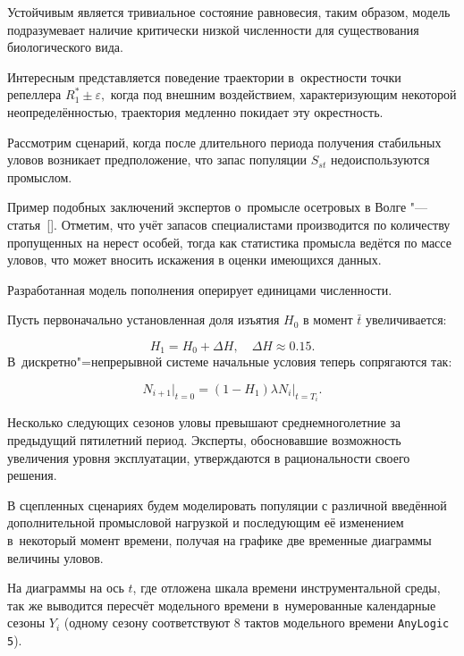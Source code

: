 Устойчивым является тривиальное состояние равновесия, таким образом, модель подразумевает наличие критически низкой численности для существования биологического вида. 

Интересным представляется поведение траектории в~окрестности точки репеллера $R^*_1 \pm \varepsilon ,$ когда под  внешним воздействием, характеризующим некоторой неопределённостью, траектория медленно покидает эту окрестность.







Рассмотрим сценарий, когда после длительного периода получения стабильных уловов возникает предположение, что запас популяции $S_{st}$ недоиспользуются промыслом. 

Пример подобных заключений экспертов о~промысле осетровых в Волге "--- статья~[]. Отметим, что учёт запасов специалистами  производится по количеству пропущенных на нерест особей, тогда как статистика промысла ведётся по массе уловов, что может вносить искажения в оценки имеющихся данных.  

Разработанная модель пополнения оперирует единицами численности. 

Пусть первоначально установленная доля изъятия $H_0$ в момент $\bar t$ увеличивается: 

$$H_1=H_0+\Delta H,\quad  \Delta H\approx 0.15.$$ В~дискретно"=непрерывной системе начальные условия теперь сопрягаются так:

$$

N_{i+1}\big|_{t=0}=(1-H_1)\lambda N_i\big|_{t=T_i}.

$$

Несколько следующих сезонов уловы превышают среднемноголетние за предыдущий пятилетний период. Эксперты, обосновавшие возможность увеличения уровня эксплуатации, утверждаются в рациональности своего решения. 





В сцепленных сценариях будем моделировать популяции с различной введённой дополнительной промысловой нагрузкой и последующим её изменением в~некоторый момент времени, получая на графике две временные диаграммы величины уловов. 

На диаграммы на ось $t$, где отложена шкала времени инструментальной среды, так же выводится пересчёт модельного времени в~нумерованные календарные сезоны $Y_i$ (одному сезону соответствуют 8 тактов модельного времени {\tt AnyLogic\,5}).

